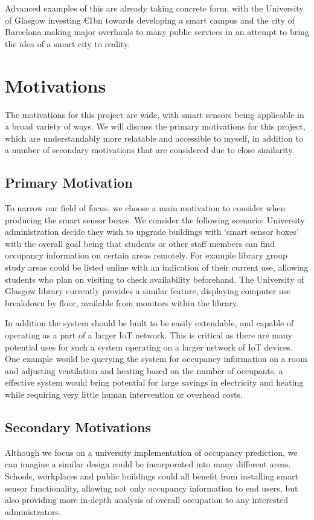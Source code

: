 \documentclass{l4proj}
\begin{document}
Advanced examples of this are already taking concrete form, with the University of Glasgow investing €1bn towards developing a smart campus\cite{c-iot-uog} and the city of Barcelona making major overhauls to many public services in an attempt to bring the idea of a smart city to reality\cite{c-iot-bar}.



\section{Motivations}
The motivations for this project are wide, with smart sensors being applicable in a broad variety of ways. We will discuss the primary motivations for this project, which are understandably more relatable and accessible to myself, in addition to a number of secondary motivations that are considered due to close similarity.

\subsection{Primary Motivation}
To narrow our field of focus, we choose a main motivation to consider when producing the smart sensor boxes. We consider the following scenario: University administration decide they wish to upgrade buildings with ‘smart sensor boxes’ with the overall goal being that students or other staff members can find occupancy information on certain areas remotely. For example library group study areas could be listed online with an indication of their current use, allowing students who plan on visiting to check availability beforehand.
The University of Glasgow library currently provides a similar feature, displaying computer use breakdown by floor, available from monitors within the library.

In addition the system should be built to be easily extendable, and capable of operating as a part of a larger IoT network. This is critical as there are many potential uses for such a system operating on a larger network of IoT devices. One example would be querying the system for occupancy information on a room and adjusting ventilation and heating based on the number of occupants, a effective system would bring potential for large savings in electricity and heating \cite{c-heating} while requiring very little human intervention or overhead costs.

\subsection{Secondary Motivations}
Although we focus on a university implementation of occupancy prediction, we can imagine a similar design could be incorporated into many different areas. Schools, workplaces and public buildings could all benefit from installing smart sensor functionality, allowing not only occupancy information to end users, but also providing more in-depth analysis of overall occupation to any interested administrators.
\end{document}
